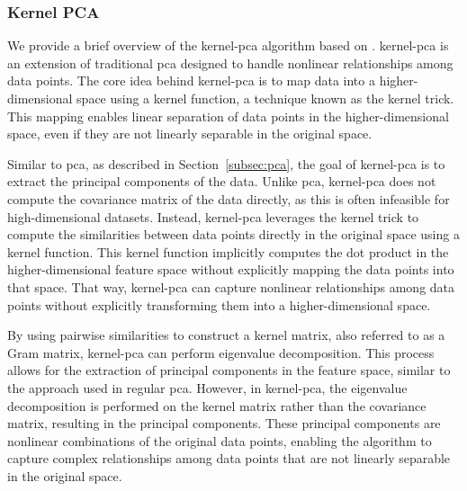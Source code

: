 \subsubsection{Kernel PCA}
We provide a brief overview of the \gls{kernel-pca} algorithm based on \citet{learningwithkernels}.
\gls{kernel-pca} is an extension of traditional \gls{pca} designed to handle nonlinear relationships among data points.
The core idea behind \gls{kernel-pca} is to map data into a higher-dimensional space using a kernel function, a technique known as the kernel trick.
This mapping enables linear separation of data points in the higher-dimensional space, even if they are not linearly separable in the original space.

Similar to \gls{pca}, as described in Section~\ref{subsec:pca}, the goal of \gls{kernel-pca} is to extract the principal components of the data.
Unlike \gls{pca}, \gls{kernel-pca} does not compute the covariance matrix of the data directly, as this is often infeasible for high-dimensional datasets.
Instead, \gls{kernel-pca} leverages the kernel trick to compute the similarities between data points directly in the original space using a kernel function.
This kernel function implicitly computes the dot product in the higher-dimensional feature space without explicitly mapping the data points into that space.
That way, \gls{kernel-pca} can capture nonlinear relationships among data points without explicitly transforming them into a higher-dimensional space.

By using pairwise similarities to construct a kernel matrix, also referred to as a Gram matrix, \gls{kernel-pca} can perform eigenvalue decomposition.
This process allows for the extraction of principal components in the feature space, similar to the approach used in regular \gls{pca}.
However, in \gls{kernel-pca}, the eigenvalue decomposition is performed on the kernel matrix rather than the covariance matrix, resulting in the principal components.
These principal components are nonlinear combinations of the original data points, enabling the algorithm to capture complex relationships among data points that are not linearly separable in the original space.